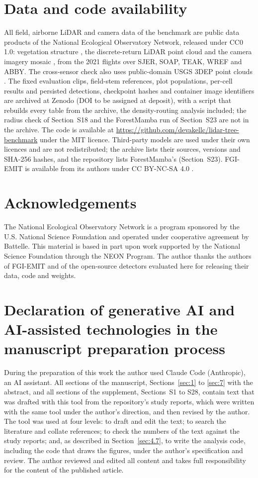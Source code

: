 \documentclass[preprint,12pt,authoryear,a4paper]{elsarticle}
\begin{document}
\section*{Data and code availability}
All field, airborne LiDAR and camera data of the benchmark are public data
products of the National Ecological Observatory Network, released under CC0 1.0:
vegetation structure \citep{neon2026vegetation}, the discrete-return LiDAR point
cloud \citep{neon2026discrete} and the camera imagery mosaic \citep{neon2026camera}, from
the 2021 flights over SJER, SOAP, TEAK, WREF and ABBY. The cross-sensor check
also uses public-domain USGS 3DEP point clouds \citep{usgs2026usgs}. The fixed
evaluation clips, field-stem references, plot populations, per-cell results and
persisted detections, checkpoint hashes and container image identifiers are
archived at Zenodo (DOI to be assigned at deposit), with a script that rebuilds
every table from the archive, the density-routing analysis included; the radius
check of Section~S18 and the ForestMamba run of Section~S23 are not in the
archive. The code is available at
\url{https://github.com/devakellc/lidar-tree-benchmark} under the MIT licence.
Third-party models are used under their own licences and are not redistributed;
the archive lists their sources, versions and SHA-256 hashes, and the repository
lists ForestMamba's (Section~S23). FGI-EMIT is available from its authors under
CC BY-NC-SA 4.0 \citep{ruoppa2026fgiemit}.

\section*{Acknowledgements}
The National Ecological Observatory Network is a program sponsored by the U.S.
National Science Foundation and operated under cooperative agreement by
Battelle. This material is based in part upon work supported by the National
Science Foundation through the NEON Program. The author thanks the authors of
FGI-EMIT and of the open-source detectors evaluated here for releasing their
data, code and weights.

\section*{Declaration of generative AI and AI-assisted technologies in the manuscript preparation process}
During the preparation of this work the author used Claude Code (Anthropic), an
AI assistant. All sections of the manuscript, Sections~\ref{sec:1} to \ref{sec:7} with the abstract,
and all sections of the supplement, Sections~S1 to S28, contain text that was
drafted with this tool from the repository's study reports, which were written
with the same tool under the author's direction, and then revised by the author.
The tool was used at four levels: to draft and edit the text; to search
the literature and collate references; to check the numbers of the text against
the study reports; and, as described in Section~\ref{sec:4.7}, to write the analysis code,
including the code that draws the figures, under the author's specification and
review. The author reviewed and edited all content and takes full responsibility
for the content of the published article.



\end{document}
